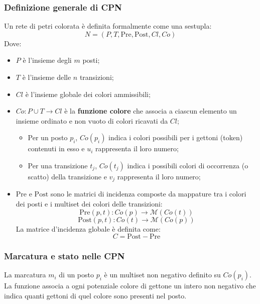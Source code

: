 \subsubsection{Definizione generale di CPN}
Un rete di petri colorata è definita formalmente come una sestupla:
\begin{equation}
	N = (P, T, \text{Pre}, \text{Post}, Cl, Co)
\end{equation}
Dove:
\begin{itemize}
	\item $P$ è l'insieme degli $m$ posti;
	\item $T$ è l'insieme delle $n$ transizioni;
	\item $Cl$ è l'insieme globale dei colori ammissibili;
	\item $Co: P \cup T \rightarrow Cl$ è la \textbf{funzione colore} che associa a ciascun elemento un insieme ordinato e non vuoto di colori ricavati da $Cl$;
	\begin{itemize}
		\item Per un posto $p_i$, $Co(p_i)$ indica i colori possibili per i gettoni (token) contenuti in esso e $u_i$ rappresenta il loro numero;
		\item Per una transizione $t_j$, $Co(t_j)$ indica i possibili colori di occorrenza (o scatto) della transizione e $v_j$ rappresenta il loro numero;
	\end{itemize}
	\item $\text{Pre}$ e $\text{Post}$ sono le matrici di incidenza composte da mappature tra i colori dei posti e i multiset dei colori delle transizioni:
	\begin{equation}
		\text{Pre}(p,t) : Co(p)\rightarrow \mathcal{M}(Co(t))
	\end{equation}
	\begin{equation}
		\text{Post}(p,t) : Co(t)\rightarrow \mathcal{M}(Co(p))
	\end{equation}
	La matrice d'incidenza globale è definita come:
	\begin{equation}
		C = \text{Post} - \text{Pre}
	\end{equation}
\end{itemize}

\subsubsection{Marcatura e stato nelle CPN}
La marcatura $m_i$ di un posto $p_i$ è un multiset non negativo definito su $Co(p_i)$. La funzione associa a ogni potenziale colore di gettone un intero non negativo che indica quanti gettoni di quel colore sono presenti nel posto.

